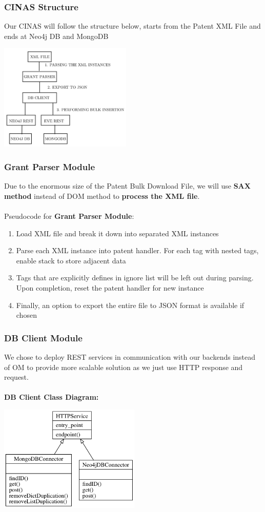 \documentclass{beamer}
\begin{document}
\begin{frame}
\frametitle{CINAS Structure}
Our CINAS will follow the structure below, starts from the Patent XML File and ends at Neo4j DB and MongoDB
\begin{center}
\includegraphics[height=2in]{cinas.png}
\end{center}
\end{frame}

\begin{frame}
\frametitle{Grant Parser Module}
Due to the enormous size of the Patent Bulk Download File, we will use \textbf{SAX method} instead of DOM method to \textbf{process the XML file}.\\~\\
Pseudocode for \textbf{Grant Parser Module}:
\begin{enumerate}
\item Load XML file and break it down into separated XML instances
\item Parse each XML instance into patent handler. For each tag with nested tags, enable stack to store adjacent data
\item Tags that are explicitly defines in ignore list will be left out during parsing. Upon completion, reset the patent handler for new instance
\item Finally, an option to export the entire file to JSON format is available if chosen
\end{enumerate}
\end{frame}

\begin{frame}
\frametitle{DB Client Module}
We chose to deploy REST services in communication with our backends instead of OM to provide more scalable solution as we just use HTTP response and request.\\~\\
\textbf{DB Client Class Diagram:}\\
\begin{center}
\includegraphics[height=2in]{dbclient.png}
\end{center}
\end{frame}
\end{document}
